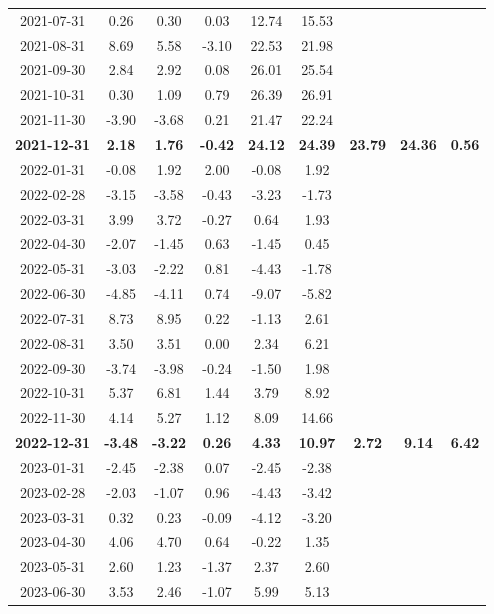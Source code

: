 \begin{longtable}{ccccccccc}
2021-07-31 & 0.26 & 0.30 & 0.03 & 12.74 & 15.53 &  &  &  \\
2021-08-31 & 8.69 & 5.58 & -3.10 & 22.53 & 21.98 &  &  &  \\
2021-09-30 & 2.84 & 2.92 & 0.08 & 26.01 & 25.54 &  &  &  \\
2021-10-31 & 0.30 & 1.09 & 0.79 & 26.39 & 26.91 &  &  &  \\
2021-11-30 & -3.90 & -3.68 & 0.21 & 21.47 & 22.24 &  &  &  \\
\textbf{2021-12-31} & \textbf{2.18} & \textbf{1.76} & \textbf{-0.42} & \textbf{24.12} & \textbf{24.39} & \textbf{23.79} & \textbf{24.36} & \textbf{0.56} \\
\midrule
2022-01-31 & -0.08 & 1.92 & 2.00 & -0.08 & 1.92 &  &  &  \\
2022-02-28 & -3.15 & -3.58 & -0.43 & -3.23 & -1.73 &  &  &  \\
2022-03-31 & 3.99 & 3.72 & -0.27 & 0.64 & 1.93 &  &  &  \\
2022-04-30 & -2.07 & -1.45 & 0.63 & -1.45 & 0.45 &  &  &  \\
2022-05-31 & -3.03 & -2.22 & 0.81 & -4.43 & -1.78 &  &  &  \\
2022-06-30 & -4.85 & -4.11 & 0.74 & -9.07 & -5.82 &  &  &  \\
2022-07-31 & 8.73 & 8.95 & 0.22 & -1.13 & 2.61 &  &  &  \\
2022-08-31 & 3.50 & 3.51 & 0.00 & 2.34 & 6.21 &  &  &  \\
2022-09-30 & -3.74 & -3.98 & -0.24 & -1.50 & 1.98 &  &  &  \\
2022-10-31 & 5.37 & 6.81 & 1.44 & 3.79 & 8.92 &  &  &  \\
2022-11-30 & 4.14 & 5.27 & 1.12 & 8.09 & 14.66 &  &  &  \\
\textbf{2022-12-31} & \textbf{-3.48} & \textbf{-3.22} & \textbf{0.26} & \textbf{4.33} & \textbf{10.97} & \textbf{2.72} & \textbf{9.14} & \textbf{6.42} \\
\midrule
2023-01-31 & -2.45 & -2.38 & 0.07 & -2.45 & -2.38 &  &  &  \\
2023-02-28 & -2.03 & -1.07 & 0.96 & -4.43 & -3.42 &  &  &  \\
2023-03-31 & 0.32 & 0.23 & -0.09 & -4.12 & -3.20 &  &  &  \\
2023-04-30 & 4.06 & 4.70 & 0.64 & -0.22 & 1.35 &  &  &  \\
2023-05-31 & 2.60 & 1.23 & -1.37 & 2.37 & 2.60 &  &  &  \\
2023-06-30 & 3.53 & 2.46 & -1.07 & 5.99 & 5.13 &  &  &  \\

\end{longtable}
